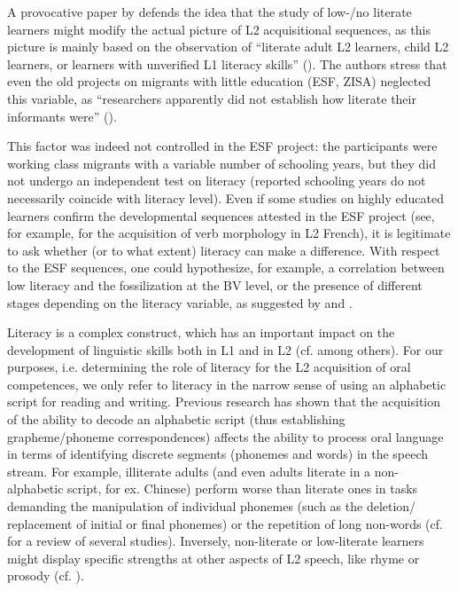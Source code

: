 \documentclass[output=paper]{langscibook}
\begin{document}
A provocative paper by \citet{BigelowTarone2004} defends the idea that the study of low-/no literate learners might modify the actual picture of L2 acquisitional sequences, as this picture is mainly based on the observation of “literate adult L2 learners, child L2 learners, or learners with unverified L1 literacy skills” (\citeyear[695]{BigelowTarone2004}). The authors stress that even the old projects on migrants with little education (ESF, ZISA) neglected this variable, as “researchers apparently did not establish how literate their informants were” (\citeyear[695]{BigelowTarone2004}). 

This factor was indeed not controlled in the ESF project: the participants were working class migrants with a variable number of schooling years, but they did not undergo an independent test on literacy (reported schooling years do not necessarily coincide with literacy level). Even if some studies on highly educated learners confirm the developmental sequences attested in the ESF project (see, for example, \citealt{Schlyter2000, BartningSchlyter2004, Granget2017} for the acquisition of verb morphology in L2 French), it is legitimate to ask whether (or to what extent) literacy can make a difference. With respect to the ESF sequences, one could hypothesize, for example, a correlation between low literacy and the fossilization at the BV level, or the presence of different stages depending on the literacy variable, as suggested by \citet{BigelowTarone2004} and \citet{TaroneEtAl2013}.     

Literacy is a complex construct, which has an important impact on the development of linguistic skills both in L1 and in L2 (cf. \citealt{Hulstijn2011} among others). For our purposes, i.e. determining the role of literacy for the L2 acquisition of oral competences, we only refer to literacy in the narrow sense of using an alphabetic script for reading and writing. Previous research has shown that the acquisition of the ability to decode an alphabetic script (thus establishing grapheme/phoneme correspondences) affects the ability to process oral language in terms of identifying discrete segments (phonemes and words) in the speech stream. For example, illiterate adults (and even adults literate in a non-alphabetic script, for ex. Chinese) perform worse than literate ones in tasks demanding the manipulation of individual phonemes (such as the deletion/ replacement of initial or final phonemes) or the repetition of long non-words (cf. \citealt{TaroneEtAl2013} for a review of several studies). Inversely, non-literate or low-literate learners might display specific strengths at other aspects of L2 speech, like rhyme or prosody (cf. \citealt{Maffia2016}). 
\end{document}
